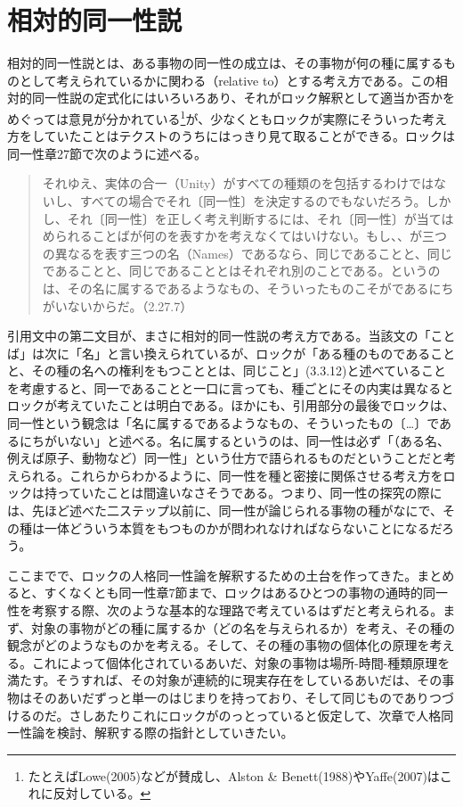 \documentclass[a4j,oneside]{jsbook}
\begin{document}
\section{
相対的同一性説
}
相対的同一性説とは、ある事物の同一性の成立は、その事物が何の種に属するものとして考えられているかに関わる（relative to）とする考え方である。この相対的同一性説の定式化にはいろいろあり、それがロック解釈として適当か否かをめぐっては意見が分かれている\footnote{たとえばLowe(2005)などが賛成し、Alston \& Benett(1988)やYaffe(2007)はこれに反対している。}が、少なくともロックが実際にそういった考え方をしていたことはテクストのうちにはっきり見て取ることができる。ロックは同一性章27節で次のように述べる。
\begin{quote}
それゆえ、実体の合一（Unity）がすべての種類のを包括するわけではないし、すべての場合でそれ〔同一性〕を決定するのでもないだろう。しかし、それ〔同一性〕を正しく考え判断するには、それ〔同一性〕が当てはめられることばが何のを表すかを考えなくてはいけない。もし、、が三つの異なるを表す三つの名（Names）であるなら、同じであることと、同じであることと、同じであることとはそれぞれ別のことである。というのは、その名に属するであるようなもの、そういったものこそがであるにちがいないからだ。（2.27.7）
\end{quote}
\par
引用文中の第二文目が、まさに相対的同一性説の考え方である。当該文の「ことば」は次に「名」と言い換えられているが、ロックが「ある種のものであることと、その種の名への権利をもつこととは、同じこと」(3.3.12)と述べていることを考慮すると、同一であることと一口に言っても、種ごとにその内実は異なるとロックが考えていたことは明白である。ほかにも、引用部分の最後でロックは、同一性という観念は「名に属するであるようなもの、そういったもの〔…〕であるにちがいない」と述べる。名に属するというのは、同一性は必ず「（ある名、例えば原子、動物など）同一性」という仕方で語られるものだということだと考えられる。これらからわかるように、同一性を種と密接に関係させる考え方をロックは持っていたことは間違いなさそうである。つまり、同一性の探究の際には、先ほど述べた二ステップ以前に、同一性が論じられる事物の種がなにで、その種は一体どういう本質をもつものかが問われなければならないことになるだろう。
\par
ここまでで、ロックの人格同一性論を解釈するための土台を作ってきた。まとめると、すくなくとも同一性章7節まで、ロックはあるひとつの事物の通時的同一性を考察する際、次のような基本的な理路で考えているはずだと考えられる。まず、対象の事物がどの種に属するか（どの名を与えられるか）を考え、その種の観念がどのようなものかを考える。そして、その種の事物の個体化の原理を考える。これによって個体化されているあいだ、対象の事物は場所-時間-種類原理を満たす。そうすれば、その対象が連続的に現実存在をしているあいだは、その事物はそのあいだずっと単一のはじまりを持っており、そして同じものでありつづけるのだ。さしあたりこれにロックがのっとっていると仮定して、次章で人格同一性論を検討、解釈する際の指針としていきたい。
\end{document}
